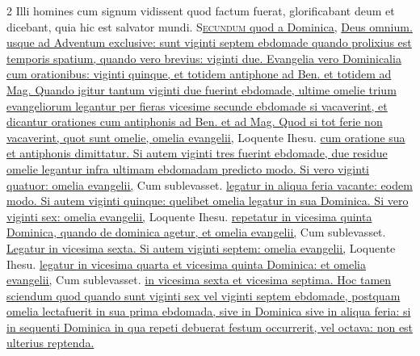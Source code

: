 \begin{multicols*}{2}
 Illi homines cum signum vidissent quod factum fuerat, glorificabant deum et dicebant, quia hic est salvator mundi.
\lettrine[lines=2]{\zallmancaps \color{Blue} S}{}\ul{\textsc{ecundum} quod a Dominica,} \hyperlink{deus-omnium}{Deus omnium.} \ul{usque ad Adventum exclusive: sunt viginti septem ebdomade quando prolixius est temporis spatium, quando vero brevius: viginti due. Evangelia vero Dominicalia cum orationibus: viginti quinque, et totidem antiphone ad Ben. et totidem ad Mag. Quando igitur tantum viginti due fuerint ebdomade, ultime omelie trium evangeliorum legantur per fieras vicesime secunde ebdomade si vacaverint, et dicantur orationes cum antiphonis ad Ben. et ad Mag. Quod si tot ferie non vacaverint, quot sunt omelie, omelia evangelii,} Loquente Ihesu. \ul{cum oratione sua et antiphonis dimittatur. Si autem viginti tres fuerint ebdomade, due residue omelie legantur infra ultimam ebdomadam predicto modo. Si vero viginti quatuor: omelia evangelii,} Cum sublevasset. \ul{legatur in aliqua feria vacante: eodem modo. Si autem viginti quinque: quelibet omelia legatur in sua Dominica. Si vero viginti sex: omelia evangelii,} Loquente Ihesu. \ul{repetatur in vicesima quinta Dominica, quando de dominica agetur, et omelia evangelii,} Cum sublevasset. \ul{Legatur in vicesima sexta. Si autem viginti septem: omelia evangelii,} Loquente Ihesu. \ul{legatur in vicesima quarta et vicesima quinta Dominica: et omelia evangelii,} Cum sublevasset. \ul{in vicesima sexta et vicesima septima. Hoc tamen sciendum quod quando sunt viginti sex vel viginti septem ebdomade, postquam omelia lectafuerit in sua prima ebdomada, sive in Dominica sive in aliqua feria: si in sequenti Dominica in qua repeti debuerat festum occurrerit, vel octava: non est ulterius reptenda.}



\end{multicols*}
